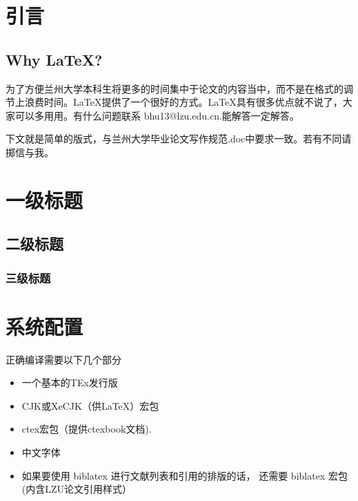 \documentclass{LZUthesis}
\begin{document}
%
%

\title{}
\entitle{}
\author{}
\major{}
\advisor{}





\frontmatter
\tableofcontents
\mainmatter
\chapter{引言}

\section{Why \LaTeX ? }
为了方便兰州大学本科生将更多的时间集中于论文的内容当中，而不是在格式的调节上浪费时间。\LaTeX{}提供了一个很好的方式。\LaTeX{}具有很多优点就不说了，大家可以多用用。有什么问题联系 bhu13@lzu.edu.cn.能解答一定解答。
\par 下文就是简单的版式，与兰州大学毕业论文写作规范.doc中要求一致。若有不同请掷信与我。
\chapter{一级标题}
\section{二级标题}
\subsection{三级标题}
\chapter{系统配置}
正确编译需要以下几个部分
\begin{itemize}

\item 一个基本的TEx发行版
\item CJK或XeCJK（供\LaTeX ）宏包
\item ctex宏包（提供ctexbook文档).
\item 中文字体
\item 如果要使用 biblatex 进行文献列表和引用的排版的话， 还需要 biblatex 宏包(内含LZU论文引用样式）
\end{itemize}
\end{document}
